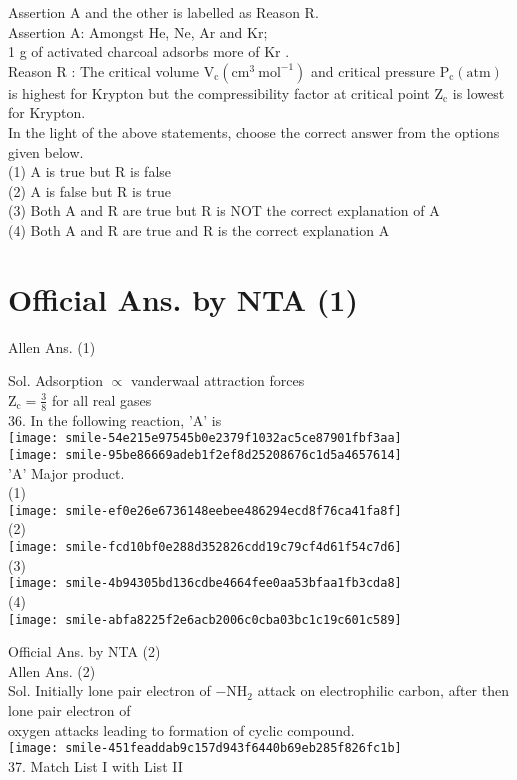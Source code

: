 \documentclass[10pt]{article}
\begin{document}
Assertion A and the other is labelled as Reason R.\\
Assertion A: Amongst He, Ne, Ar and Kr;\\
1 g of activated charcoal adsorbs more of Kr .\\
Reason R : The critical volume \(\mathrm{V}_{\mathrm{c}}\left(\mathrm{cm}^{3} \mathrm{~mol}^{-1}\right)\) and critical pressure \(\mathrm{P}_{\mathrm{c}}(\mathrm{atm})\) is highest for Krypton but the compressibility factor at critical point \(\mathrm{Z}_{\mathrm{c}}\) is lowest for Krypton.\\
In the light of the above statements, choose the correct answer from the options given below.\\
(1) A is true but R is false\\
(2) A is false but R is true\\
(3) Both A and R are true but R is NOT the correct explanation of A\\
(4) Both A and R are true and R is the correct explanation A

\section*{Official Ans. by NTA (1)}
Allen Ans. (1)

Sol. Adsorption \(\propto\) vanderwaal attraction forces\\
\(\mathrm{Z}_{\mathrm{c}}=\frac{3}{8}\) for all real gases\\
36. In the following reaction, 'A' is\\
\texttt{[image: smile-54e215e97545b0e2379f1032ac5ce87901fbf3aa]}\\
\texttt{[image: smile-95be86669adeb1f2ef8d25208676c1d5a4657614]}\\
'A' Major product.\\
(1)\\
\texttt{[image: smile-ef0e26e6736148eebee486294ecd8f76ca41fa8f]}\\
(2)\\
\texttt{[image: smile-fcd10bf0e288d352826cdd19c79cf4d61f54c7d6]}\\
(3)\\
\texttt{[image: smile-4b94305bd136cdbe4664fee0aa53bfaa1fb3cda8]}\\
(4)\\
\texttt{[image: smile-abfa8225f2e6acb2006c0cba03bc1c19c601c589]}

Official Ans. by NTA (2)\\
Allen Ans. (2)\\
Sol. Initially lone pair electron of \(-\mathrm{NH}_{2}\) attack on electrophilic carbon, after then lone pair electron of\\
oxygen attacks leading to formation of cyclic compound.\\
\texttt{[image: smile-451feaddab9c157d943f6440b69eb285f826fc1b]}\\
37. Match List I with List II
\end{document}
